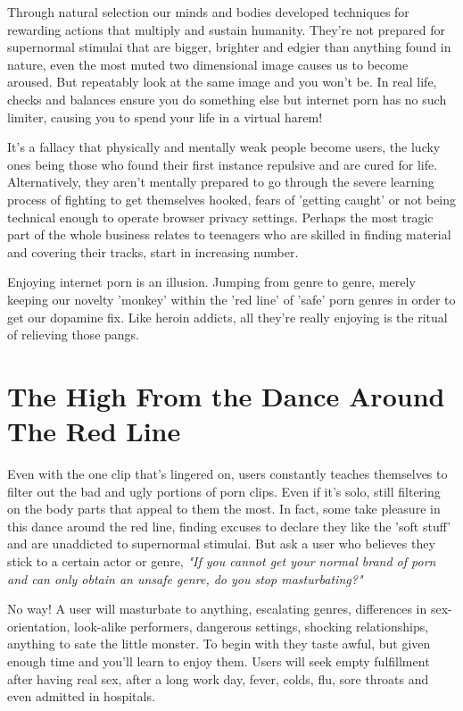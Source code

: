 \documentclass[easypeasy.tex]{subfiles}
\begin{document}
Through natural selection our minds and bodies developed techniques for rewarding actions that multiply and sustain humanity. They're not prepared for supernormal stimulai that are bigger, brighter and edgier than anything found in nature, even the most muted two dimensional image causes us to become aroused. But repeatably look at the same image and you won't be. In real life, checks and balances ensure you do something else but internet porn has no such limiter, causing you to spend your life in a virtual harem!

It's a fallacy that physically and mentally weak people become users, the lucky ones being those who found their first instance repulsive and are cured for life. Alternatively, they aren't mentally prepared to go through the severe learning process of fighting to get themselves hooked, fears of 'getting caught' or not being technical enough to operate browser privacy settings. Perhaps the most tragic part of the whole business relates to teenagers who are skilled in finding material and covering their tracks, start in increasing number.

Enjoying internet porn is an illusion. Jumping from genre to genre, merely keeping our novelty 'monkey' within the 'red line' of 'safe' porn genres in order to get our dopamine fix. Like heroin addicts, all they're really enjoying is the ritual of relieving those pangs.

\section{The High From the Dance Around The Red Line}
Even with the one clip that's lingered on, users constantly teaches themselves to filter out the bad and ugly portions of porn clips. Even if it's solo, still filtering on the body parts that appeal to them the most. In fact, some take pleasure in this dance around the red line, finding excuses to declare they like the 'soft stuff' and are unaddicted to supernormal stimulai. But ask a user who believes they stick to a certain actor or genre, \textit{"If you cannot get your normal brand of porn and can only obtain an unsafe genre, do you stop masturbating?"}

No way! A user will masturbate to anything, escalating genres, differences in sex-orientation, look-alike performers, dangerous settings, shocking relationships, anything to sate the little monster. To begin with they taste awful, but given enough time and you'll learn to enjoy them. Users will seek empty fulfillment after having real sex, after a long work day, fever, colds, flu, sore throats and even admitted in hospitals.
\end{document}
